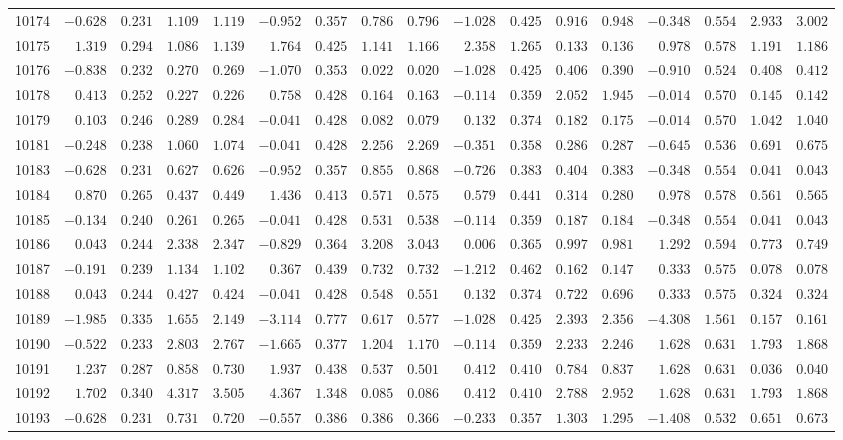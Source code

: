 \documentclass[6pt]{article}
\begin{document}
\begin{landscape}
{\begin{longtable}{lrrrrrrrrrrrrrrrr}
10174&$-0.628$&$0.231$&$1.109$&$1.119$&$-0.952$&$0.357$&$0.786$&$0.796$&$-1.028$&$0.425$&$0.916$&$0.948$&$-0.348$&$0.554$&$2.933$&$3.002$\tabularnewline
10175&$ 1.319$&$0.294$&$1.086$&$1.139$&$ 1.764$&$0.425$&$1.141$&$1.166$&$ 2.358$&$1.265$&$0.133$&$0.136$&$ 0.978$&$0.578$&$1.191$&$1.186$\tabularnewline
10176&$-0.838$&$0.232$&$0.270$&$0.269$&$-1.070$&$0.353$&$0.022$&$0.020$&$-1.028$&$0.425$&$0.406$&$0.390$&$-0.910$&$0.524$&$0.408$&$0.412$\tabularnewline
10178&$ 0.413$&$0.252$&$0.227$&$0.226$&$ 0.758$&$0.428$&$0.164$&$0.163$&$-0.114$&$0.359$&$2.052$&$1.945$&$-0.014$&$0.570$&$0.145$&$0.142$\tabularnewline
10179&$ 0.103$&$0.246$&$0.289$&$0.284$&$-0.041$&$0.428$&$0.082$&$0.079$&$ 0.132$&$0.374$&$0.182$&$0.175$&$-0.014$&$0.570$&$1.042$&$1.040$\tabularnewline
10181&$-0.248$&$0.238$&$1.060$&$1.074$&$-0.041$&$0.428$&$2.256$&$2.269$&$-0.351$&$0.358$&$0.286$&$0.287$&$-0.645$&$0.536$&$0.691$&$0.675$\tabularnewline
10183&$-0.628$&$0.231$&$0.627$&$0.626$&$-0.952$&$0.357$&$0.855$&$0.868$&$-0.726$&$0.383$&$0.404$&$0.383$&$-0.348$&$0.554$&$0.041$&$0.043$\tabularnewline
10184&$ 0.870$&$0.265$&$0.437$&$0.449$&$ 1.436$&$0.413$&$0.571$&$0.575$&$ 0.579$&$0.441$&$0.314$&$0.280$&$ 0.978$&$0.578$&$0.561$&$0.565$\tabularnewline
10185&$-0.134$&$0.240$&$0.261$&$0.265$&$-0.041$&$0.428$&$0.531$&$0.538$&$-0.114$&$0.359$&$0.187$&$0.184$&$-0.348$&$0.554$&$0.041$&$0.043$\tabularnewline
10186&$ 0.043$&$0.244$&$2.338$&$2.347$&$-0.829$&$0.364$&$3.208$&$3.043$&$ 0.006$&$0.365$&$0.997$&$0.981$&$ 1.292$&$0.594$&$0.773$&$0.749$\tabularnewline
10187&$-0.191$&$0.239$&$1.134$&$1.102$&$ 0.367$&$0.439$&$0.732$&$0.732$&$-1.212$&$0.462$&$0.162$&$0.147$&$ 0.333$&$0.575$&$0.078$&$0.078$\tabularnewline
10188&$ 0.043$&$0.244$&$0.427$&$0.424$&$-0.041$&$0.428$&$0.548$&$0.551$&$ 0.132$&$0.374$&$0.722$&$0.696$&$ 0.333$&$0.575$&$0.324$&$0.324$\tabularnewline
10189&$-1.985$&$0.335$&$1.655$&$2.149$&$-3.114$&$0.777$&$0.617$&$0.577$&$-1.028$&$0.425$&$2.393$&$2.356$&$-4.308$&$1.561$&$0.157$&$0.161$\tabularnewline
10190&$-0.522$&$0.233$&$2.803$&$2.767$&$-1.665$&$0.377$&$1.204$&$1.170$&$-0.114$&$0.359$&$2.233$&$2.246$&$ 1.628$&$0.631$&$1.793$&$1.868$\tabularnewline
10191&$ 1.237$&$0.287$&$0.858$&$0.730$&$ 1.937$&$0.438$&$0.537$&$0.501$&$ 0.412$&$0.410$&$0.784$&$0.837$&$ 1.628$&$0.631$&$0.036$&$0.040$\tabularnewline
10192&$ 1.702$&$0.340$&$4.317$&$3.505$&$ 4.367$&$1.348$&$0.085$&$0.086$&$ 0.412$&$0.410$&$2.788$&$2.952$&$ 1.628$&$0.631$&$1.793$&$1.868$\tabularnewline
10193&$-0.628$&$0.231$&$0.731$&$0.720$&$-0.557$&$0.386$&$0.386$&$0.366$&$-0.233$&$0.357$&$1.303$&$1.295$&$-1.408$&$0.532$&$0.651$&$0.673$\tabularnewline

\end{longtable}}
\end{landscape}
\end{document}
